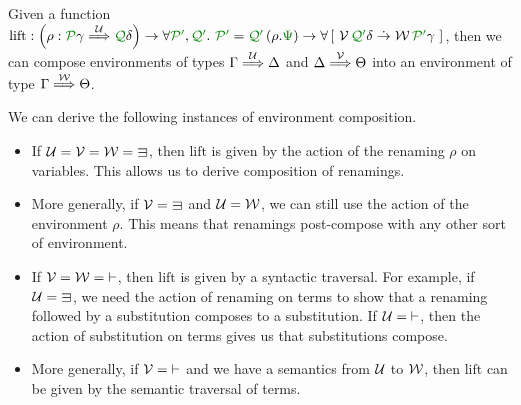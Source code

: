 \begin{corollary}
  Given a function
  $\mathrm{lift} : \plr{\rho : \grP\gamma \env\U \grQ\delta} \to
  \forall \grPprime, \grQprime.~\grPprime = \grQprime\plr{\rho.\gr\Psi} \to
  \forallb{\V\,\grQprime\delta \dotto \W\,\grPprime\gamma}$, then we can
  compose environments of types $\Gamma \stackrel{\mathcal U}\Longrightarrow \Delta$ and
  $\Delta \stackrel{\mathcal V}\Longrightarrow \Theta$ into an environment of type $\Gamma \stackrel{\mathcal W}\Longrightarrow \Theta$.
\end{corollary}

\begin{example}
  We can derive the following instances of environment composition.
  \begin{itemize}
    \item If $\U = \V = \W = {\sqni}$, then $\mathrm{lift}$ is given by the
      action of the renaming $\rho$ on variables.
      This allows us to derive composition of renamings.
    \item More generally, if $\V = {\sqni}$ and $\mathcal U = \mathcal W$, we can still use
      the action of the environment $\rho$.
      This means that renamings post-compose with any other sort of environment.
    \item If $\mathcal V = \mathcal W = {\vdash}$, then $\mathrm{lift}$ is given by a
      syntactic traversal.
      For example, if $\U = {\sqni}$, we need the action of renaming on terms
      to show that a renaming followed by a substitution composes to a
      substitution.
      If $\mathcal U = {\vdash}$, then the action of substitution on terms gives us that
      substitutions compose.
    \item More generally, if $\mathcal V = {\vdash}$ and we have a semantics from
      $\mathcal U$ to $\mathcal W$, then $\mathrm{lift}$ can be given by the semantic traversal
      of terms.
  \end{itemize}
\end{example}


%

